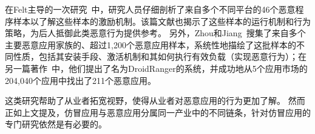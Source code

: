 在Felt主导的一次研究~\cite{Felt2011ASO}中，研究人员仔细剖析了来自多个不同平台的46个恶意程序样本以了解这些样本的激励机制。该篇文献也揭示了这些样本的运行机制和行为策略，为后人抵御此类恶意行为提供参考。
另外，Zhou和Jiang~\cite{Zhou2012DissectingAM}搜集了来自多个主要恶意应用家族的、超过1,200个恶意应用样本，系统性地描绘了这批样本的不同性质，包括其安装手段、激活机制和其如何执行有效负载（实现恶意行为）；在另一篇著作~\cite{zhou2012hey}中，他们提出了名为DroidRanger的系统，并成功地从5个应用市场的204,040个应用中找出了211个恶意应用。

这类研究帮助了从业者拓宽视野，使得从业者对恶意应用的行为更加了解。
然而正如上文提及，仿冒应用与恶意应用分属同一产业中的不同链条，针对仿冒应用的专门研究依然是有必要的。

